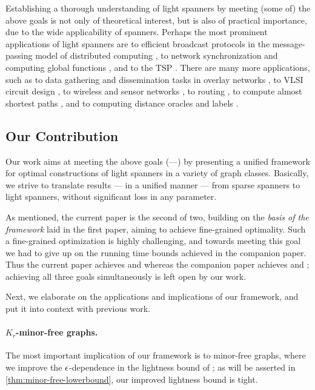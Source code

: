 Establishing a thorough understanding of light spanners by meeting (some of) the above goals is not only of theoretical interest, but is also of practical importance, due to the wide applicability of spanners.  Perhaps the most prominent applications of light spanners are to efficient broadcast protocols in the message-passing model of distributed computing \cite{ABP90,ABP91},
to network synchronization and computing global functions \cite{Awerbuch85,PU89,ABP90,ABP91,Peleg00}, and to the TSP \cite{Klein05,Klein06,RS98,GLN02,BLW17,Gottlieb15}.
There are many more applications, such as to data gathering and dissemination tasks in overlay networks \cite{BKRCV02,VWFME03,KV01}, 
to VLSI circuit design \cite{CKRSW91,CKRSW292,CKRSW92,SCRS01},
to wireless and sensor networks \cite{RW04,BDS04,SS10}, 
to routing \cite{WCT02,PU89,PU89b,TZ01}, 
to compute almost shortest paths \cite{Cohen98,RZ11,Elkin05,EZ06,FKMSZ05},
and to computing distance oracles and labels \cite{Peleg00Prox,TZ01b,RTZ05}. 


\subsection{Our Contribution} \label{subsec:contribution}
Our work aims at meeting the above goals (---) by presenting a unified framework for optimal constructions of light spanners in a variety of graph classes.
Basically, we strive to translate results --- in a unified manner --- from sparse spanners to light spanners, without significant loss in any parameter. 

As mentioned, the current paper is the second of two, building on the {\em basis of the framework} laid in the first paper,  aiming to achieve fine-grained optimality. Such a fine-grained optimization is highly challenging, and towards meeting this goal we had to give up on the running time bounds achieved in the companion paper. Thus the current paper achieves  and  whereas the companion paper achieves  and ;
achieving all three goals simultaneously is left open by our work. 

Next, we elaborate on the applications and implications of our framework, and put it into context with previous work. 

\paragraph{$K_r$-minor-free graphs.~}  The most important implication of our framework is to minor-free graphs,
where we improve the $\epsilon$-dependence in the lightness bound of \cite{BLW17}; as will be asserted in \cref{thm:minor-free-lowerbound},
our improved lightness bound is tight.

